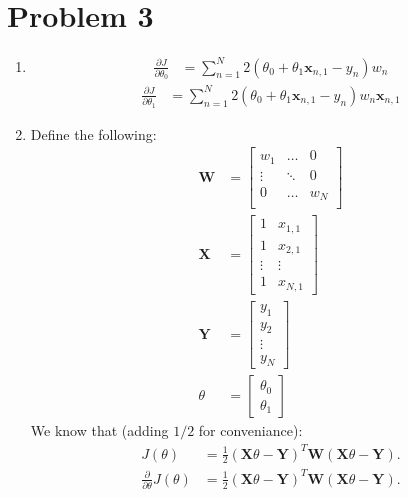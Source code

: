 \documentclass[11pt]{article}
\begin{document}
\section{Problem 3}
\begin{enumerate}
\item
    \begin{align*}
    \frac{\partial J}{\partial \theta_0}
    &=
    \sum_{n=1}^N 2(\theta_0 + \theta_1 \textbf{x}_{n,1} - y_n)w_n
    \end{align*}
    \begin{align*}
      \frac{\partial J}{\partial \theta_1}
    &=
      \sum_{n=1}^N 2(\theta_0 + \theta_1 \textbf{x}_{n,1} - y_n)w_n\textbf{x}_{n,1}
    \end{align*}
  \item
    Define the following:
    \begin{align*}
      \textbf{W} &= \begin{bmatrix}
        w_1 &\dots &0\\
        \vdots &\ddots &0\\
        0 &\dots &w_N\\
      \end{bmatrix}\\
        \textbf{X} &= \begin{bmatrix}
          1 &x_{1,1}\\
          1 &x_{2,1}\\
          \vdots &\vdots\\
          1 &x_{N,1} 
        \end{bmatrix}\\
        \textbf{Y} &= \begin{bmatrix}
          y_1\\
          y_2\\
          \vdots\\
          y_N
        \end{bmatrix}\\
        \theta &= \begin{bmatrix}
          \theta_0\\
          \theta_1
        \end{bmatrix}
    \end{align*}
    We know that (adding $1/2$ for conveniance):
    \begin{align*}
      J(\theta)
      &= \frac{1}{2}(\textbf{X}\theta - \textbf{Y})^T\textbf{W}(\textbf{X}\theta - \textbf{Y}).\\
      \frac{\partial}{\partial \theta} J(\theta) &= \frac{1}{2}(\textbf{X}\theta - \textbf{Y})^T\textbf{W}(\textbf{X}\theta - \textbf{Y}).\\

\end{align*}
\end{enumerate}
\end{document}
